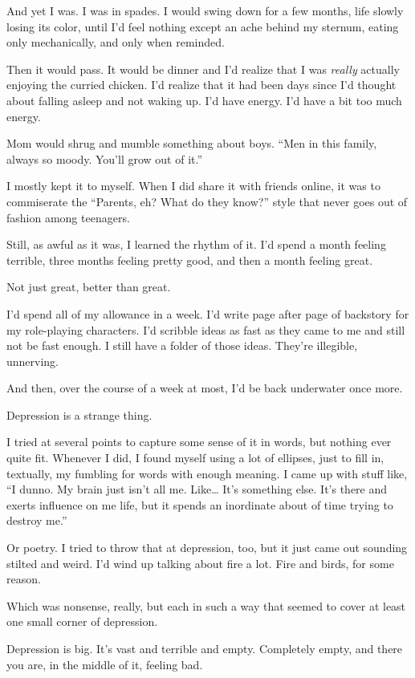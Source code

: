And yet I was. I was in spades. I would swing down for a few months, life slowly losing its color, until I'd feel nothing except an ache behind my sternum, eating only mechanically, and only when reminded.

Then it would pass. It would be dinner and I'd realize that I was \emph{really} actually enjoying the curried chicken. I'd realize that it had been days since I'd thought about falling asleep and not waking up. I'd have energy. I'd have a bit too much energy.

Mom would shrug and mumble something about boys. ``Men in this family, always so moody. You'll grow out of it.''

I mostly kept it to myself. When I did share it with friends online, it was to commiserate the ``Parents, eh? What do they know?'' style that never goes out of fashion among teenagers.

Still, as awful as it was, I learned the rhythm of it. I'd spend a month feeling terrible, three months feeling pretty good, and then a month feeling great.

Not just great, better than great.

I'd spend all of my allowance in a week. I'd write page after page of backstory for my role-playing characters. I'd scribble ideas as fast as they came to me and still not be fast enough. I still have a folder of those ideas. They're illegible, unnerving.

And then, over the course of a week at most, I'd be back underwater once more.

Depression is a strange thing.

I tried at several points to capture some sense of it in words, but nothing ever quite fit. Whenever I did, I found myself using a lot of ellipses, just to fill in, textually, my fumbling for words with enough meaning. I came up with stuff like, ``I dunno. My brain just isn't all me. Like\ldots{} It's something else. It's there and exerts influence on me life, but it spends an inordinate about of time trying to destroy me.''

Or poetry. I tried to throw that at depression, too, but it just came out sounding stilted and weird. I'd wind up talking about fire a lot. Fire and birds, for some reason.

Which was nonsense, really, but each in such a way that seemed to cover at least one small corner of depression.

Depression is big. It's vast and terrible and empty. Completely empty, and there you are, in the middle of it, feeling bad.

